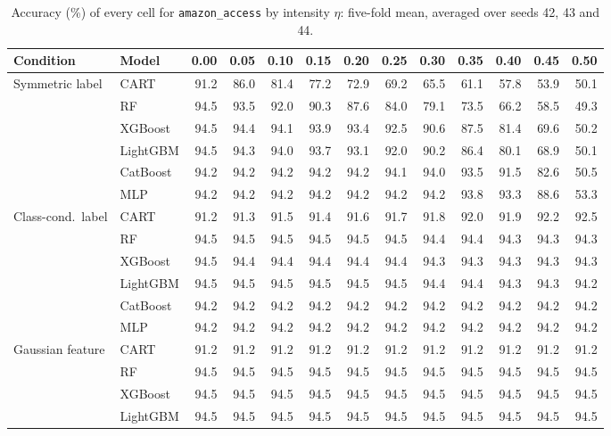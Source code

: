 \documentclass[pdflatex,sn-mathphys]{sn-jnl}
\theoremstyle{thmstyleone}
\begin{document}
\begin{table}[htbp]
\centering
\tiny
\setlength{\tabcolsep}{2.6pt}
\caption{Accuracy (\%) of every cell for \texttt{amazon\_access} by intensity $\eta$: five-fold mean, averaged over seeds 42, 43 and 44.}
\label{tab:grid_amazon_access}
\begin{tabular}{@{}llrrrrrrrrrrr@{}}
\toprule
Condition & Model & 0.00 & 0.05 & 0.10 & 0.15 & 0.20 & 0.25 & 0.30 & 0.35 & 0.40 & 0.45 & 0.50 \\
\midrule
Symmetric label & CART & 91.2 & 86.0 & 81.4 & 77.2 & 72.9 & 69.2 & 65.5 & 61.1 & 57.8 & 53.9 & 50.1 \\
 & RF & 94.5 & 93.5 & 92.0 & 90.3 & 87.6 & 84.0 & 79.1 & 73.5 & 66.2 & 58.5 & 49.3 \\
 & XGBoost & 94.5 & 94.4 & 94.1 & 93.9 & 93.4 & 92.5 & 90.6 & 87.5 & 81.4 & 69.6 & 50.2 \\
 & LightGBM & 94.5 & 94.3 & 94.0 & 93.7 & 93.1 & 92.0 & 90.2 & 86.4 & 80.1 & 68.9 & 50.1 \\
 & CatBoost & 94.2 & 94.2 & 94.2 & 94.2 & 94.2 & 94.1 & 94.0 & 93.5 & 91.5 & 82.6 & 50.5 \\
 & MLP & 94.2 & 94.2 & 94.2 & 94.2 & 94.2 & 94.2 & 94.2 & 93.8 & 93.3 & 88.6 & 53.3 \\
\midrule
Class-cond.\ label & CART & 91.2 & 91.3 & 91.5 & 91.4 & 91.6 & 91.7 & 91.8 & 92.0 & 91.9 & 92.2 & 92.5 \\
 & RF & 94.5 & 94.5 & 94.5 & 94.5 & 94.5 & 94.5 & 94.4 & 94.4 & 94.3 & 94.3 & 94.3 \\
 & XGBoost & 94.5 & 94.4 & 94.4 & 94.4 & 94.4 & 94.4 & 94.3 & 94.3 & 94.3 & 94.3 & 94.3 \\
 & LightGBM & 94.5 & 94.5 & 94.5 & 94.5 & 94.5 & 94.5 & 94.4 & 94.4 & 94.3 & 94.3 & 94.2 \\
 & CatBoost & 94.2 & 94.2 & 94.2 & 94.2 & 94.2 & 94.2 & 94.2 & 94.2 & 94.2 & 94.2 & 94.2 \\
 & MLP & 94.2 & 94.2 & 94.2 & 94.2 & 94.2 & 94.2 & 94.2 & 94.2 & 94.2 & 94.2 & 94.2 \\
\midrule
Gaussian feature & CART & 91.2 & 91.2 & 91.2 & 91.2 & 91.2 & 91.2 & 91.2 & 91.2 & 91.2 & 91.2 & 91.2 \\
 & RF & 94.5 & 94.5 & 94.5 & 94.5 & 94.5 & 94.5 & 94.5 & 94.5 & 94.5 & 94.5 & 94.5 \\
 & XGBoost & 94.5 & 94.5 & 94.5 & 94.5 & 94.5 & 94.5 & 94.5 & 94.5 & 94.5 & 94.5 & 94.5 \\
 & LightGBM & 94.5 & 94.5 & 94.5 & 94.5 & 94.5 & 94.5 & 94.5 & 94.5 & 94.5 & 94.5 & 94.5 \\

\end{tabular}
\end{table}
\end{document}
